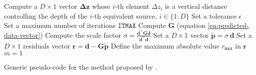 \begin{algorithm}
	\Input{}
	Compute a $D \times 1$ vector $\boldsymbol{\Delta}\mathbf{z}$ whose $i$-th element $\Delta z_{i}$ 
	is a vertical distance controlling the depth of the $i$-th equivalent source, $i \in \{1:D\}$ \;
	Set a tolerance $\epsilon$ \;
	Set a maximum number of iterations $\mathtt{ITMAX}$ \;
	Compute $\mathbf{G}$ (equation \ref{eq:predicted-data-vector}) \;
	Compute the scale factor $\sigma = \frac{\mathbf{d}^{\top} \mathbf{G}\mathbf{d}}{\mathbf{d}^{\top}\mathbf{d}}$\;
	Set a $D \times 1$ vector $\tilde{\mathbf{p}} = \sigma \, \mathbf{d}$ \;
	Set a $D \times 1$ residuals vector $\mathbf{r} = \mathbf{d} - \mathbf{G} \tilde{\mathbf{p}}$ \;
	Define the maximum absolute value $r_{\mathtt{max}}$ in $\mathbf{r}$ \;
	$m = 1$ \;
	\caption{Generic pseudo-code for the method proposed by \cite{cordell1992}.}
	\label{alg:C92}
\end{algorithm}

